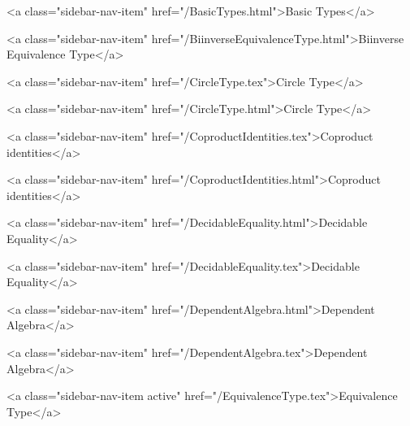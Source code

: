       
    
      
        
          <a class="sidebar-nav-item" href="/BasicTypes.html">Basic Types</a>
        
      
    
      
        
          <a class="sidebar-nav-item" href="/BiinverseEquivalenceType.html">Biinverse Equivalence Type</a>
        
      
    
      
        
          <a class="sidebar-nav-item" href="/CircleType.tex">Circle Type</a>
        
      
    
      
        
          <a class="sidebar-nav-item" href="/CircleType.html">Circle Type</a>
        
      
    
      
        
          <a class="sidebar-nav-item" href="/CoproductIdentities.tex">Coproduct identities</a>
        
      
    
      
        
          <a class="sidebar-nav-item" href="/CoproductIdentities.html">Coproduct identities</a>
        
      
    
      
        
          <a class="sidebar-nav-item" href="/DecidableEquality.html">Decidable Equality</a>
        
      
    
      
        
          <a class="sidebar-nav-item" href="/DecidableEquality.tex">Decidable Equality</a>
        
      
    
      
        
          <a class="sidebar-nav-item" href="/DependentAlgebra.html">Dependent Algebra</a>
        
      
    
      
        
          <a class="sidebar-nav-item" href="/DependentAlgebra.tex">Dependent Algebra</a>
        
      
    
      
        
          <a class="sidebar-nav-item active" href="/EquivalenceType.tex">Equivalence Type</a>
        
